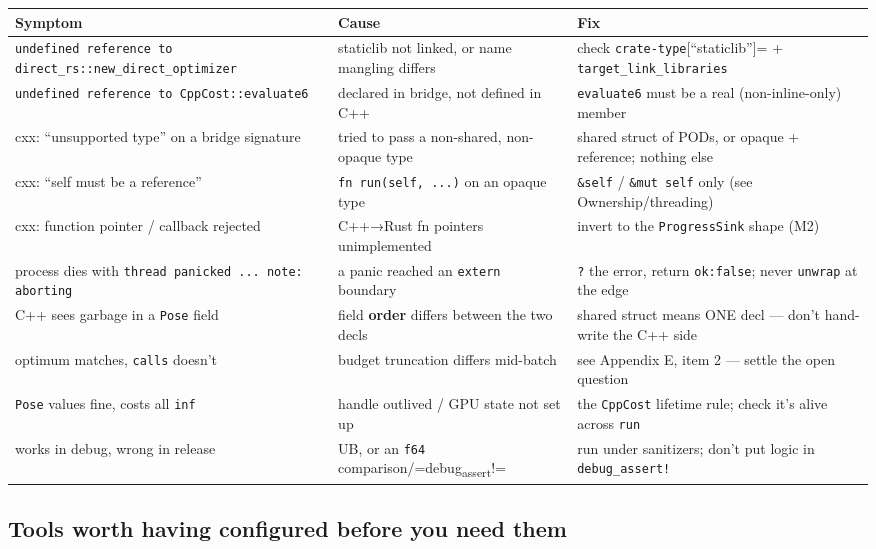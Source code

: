 \documentclass[11pt]{article}
\begin{document}
\begin{center}
\begin{tabular}{lll}
Symptom & Cause & Fix\\
\hline
\texttt{undefined reference to direct\_rs::new\_direct\_optimizer} & staticlib not linked, or name mangling differs & check \texttt{crate-type}{[}``staticlib'']= + \texttt{target\_link\_libraries}\\
\texttt{undefined reference to CppCost::evaluate6} & declared in bridge, not defined in C++ & \texttt{evaluate6} must be a real (non-inline-only) member\\
cxx: ``unsupported type'' on a bridge signature & tried to pass a non-shared, non-opaque type & shared struct of PODs, or opaque + reference; nothing else\\
cxx: ``self must be a reference'' & \texttt{fn run(self, ...)} on an opaque type & \texttt{\&self} / \texttt{\&mut self} only (see Ownership/threading)\\
cxx: function pointer / callback rejected & C++→Rust fn pointers unimplemented & invert to the \texttt{ProgressSink} shape (M2)\\
process dies with \texttt{thread panicked ... note: aborting} & a panic reached an \texttt{extern} boundary & \texttt{?} the error, return \texttt{ok:false}; never \texttt{unwrap} at the edge\\
C++ sees garbage in a \texttt{Pose} field & field \textbf{order} differs between the two decls & shared struct means ONE decl — don't hand-write the C++ side\\
optimum matches, \texttt{calls} doesn't & budget truncation differs mid-batch & see Appendix E, item 2 — settle the open question\\
\texttt{Pose} values fine, costs all \texttt{inf} & handle outlived / GPU state not set up & the \texttt{CppCost} lifetime rule; check it's alive across \texttt{run}\\
works in debug, wrong in release & UB, or an \texttt{f64} comparison/=debug\textsubscript{assert}!= & run under sanitizers; don't put logic in \texttt{debug\_assert!}\\
\end{tabular}
\end{center}
\subsection{Tools worth having configured before you need them}
\label{sec:orgc4672a2}
\end{document}
